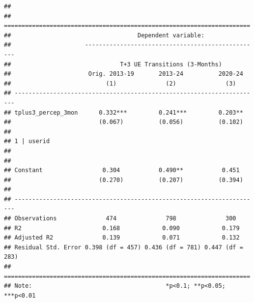 \documentclass[
]{article}
\begin{document}
\begin{verbatim}
## 
## ======================================================================
##                                    Dependent variable:                
##                     --------------------------------------------------
##                               T+3 UE Transitions (3-Months)           
##                      Orig. 2013-19       2013-24          2020-24     
##                           (1)              (2)              (3)       
## ----------------------------------------------------------------------
## tplus3_percep_3mon      0.332***         0.241***         0.203**     
##                         (0.067)          (0.056)          (0.102)     
##                                                                       
## 1 | userid                                                            
##                                                                       
##                                                                       
## Constant                 0.304           0.490**           0.451      
##                         (0.270)          (0.207)          (0.394)     
##                                                                       
## ----------------------------------------------------------------------
## Observations              474              798              300       
## R2                       0.168            0.090            0.179      
## Adjusted R2              0.139            0.071            0.132      
## Residual Std. Error 0.398 (df = 457) 0.436 (df = 781) 0.447 (df = 283)
## ======================================================================
## Note:                                      *p<0.1; **p<0.05; ***p<0.01
\end{verbatim}
\end{document}
